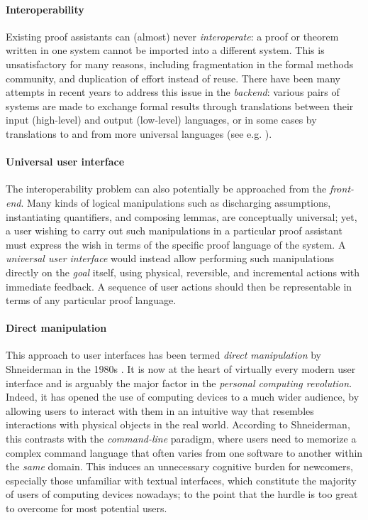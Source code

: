 \paragraph{Interoperability}

Existing proof assistants can (almost) never \emph{interoperate}: a proof or
theorem written in one system cannot be imported into a different system. This
is unsatisfactory for many reasons, including fragmentation in the formal
methods community, and duplication of effort instead of reuse. There have been
many attempts in recent years to address this issue in the \emph{backend}:
various pairs of systems are made to exchange formal results through
translations between their input (high-level) and output (low-level) languages,
or in some cases by translations to and from more universal languages (see e.g.
).

\paragraph{Universal user interface}

The interoperability problem can also potentially be approached from the
\emph{front-end}. Many kinds of logical manipulations such as discharging
assumptions, instantiating quantifiers, and composing lemmas, are conceptually
universal; yet, a user wishing to carry out such manipulations in a particular
proof assistant must express the wish in terms of the specific proof language of
the system. A \emph{universal user interface} would instead allow performing
such manipulations directly on the \emph{goal} itself, using physical,
reversible, and incremental actions with immediate feedback. A sequence of user
actions should then be representable in terms of any particular proof language.

\paragraph{Direct manipulation}

This approach to user interfaces has been termed \emph{direct manipulation} by
Shneiderman in the 1980s . It is now at the
heart of virtually every modern user interface and is arguably the major factor
in the \emph{personal computing revolution}. Indeed, it has opened the use of
computing devices to a much wider audience, by allowing users to interact with
them in an intuitive way that resembles interactions with physical objects in
the real world. According to Shneiderman, this contrasts with the
\emph{command-line} paradigm, where users need to memorize a complex command
language that often varies from one software to another within the \emph{same}
domain. This induces an unnecessary cognitive burden for newcomers, especially
those unfamiliar with textual interfaces, which constitute the majority of users
of computing devices nowadays; to the point that the hurdle is too great to
overcome for most potential users.

